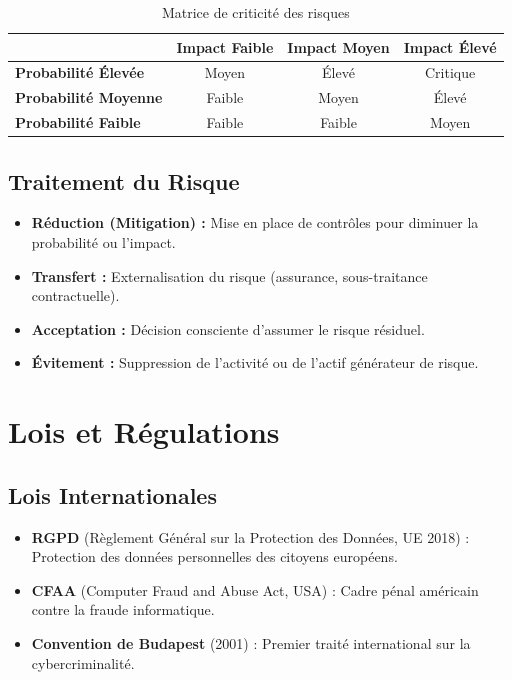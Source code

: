 \begin{table}[H]
\centering
\small
\begin{tabular}{lccc}
    \toprule
    & \textbf{Impact Faible} & \textbf{Impact Moyen} & \textbf{Impact Élevé} \\
    \midrule
    \textbf{Probabilité Élevée}  & Moyen  & Élevé    & Critique \\
    \textbf{Probabilité Moyenne} & Faible & Moyen    & Élevé    \\
    \textbf{Probabilité Faible}  & Faible & Faible   & Moyen    \\
    \bottomrule
\end{tabular}
\caption{Matrice de criticité des risques}
\end{table}

\subsection{Traitement du Risque}

\begin{itemize}
    \item \textbf{Réduction (Mitigation) :} Mise en place de contrôles pour diminuer la probabilité ou l'impact.
    \item \textbf{Transfert :} Externalisation du risque (assurance, sous-traitance contractuelle).
    \item \textbf{Acceptation :} Décision consciente d'assumer le risque résiduel.
    \item \textbf{Évitement :} Suppression de l'activité ou de l'actif générateur de risque.
\end{itemize}

\section{Lois et Régulations}

\subsection{Lois Internationales}
\begin{itemize}
    \item \textbf{RGPD} (Règlement Général sur la Protection des Données, UE 2018) : Protection des données personnelles des citoyens européens.
    \item \textbf{CFAA} (Computer Fraud and Abuse Act, USA) : Cadre pénal américain contre la fraude informatique.
    \item \textbf{Convention de Budapest} (2001) : Premier traité international sur la cybercriminalité.
\end{itemize}

